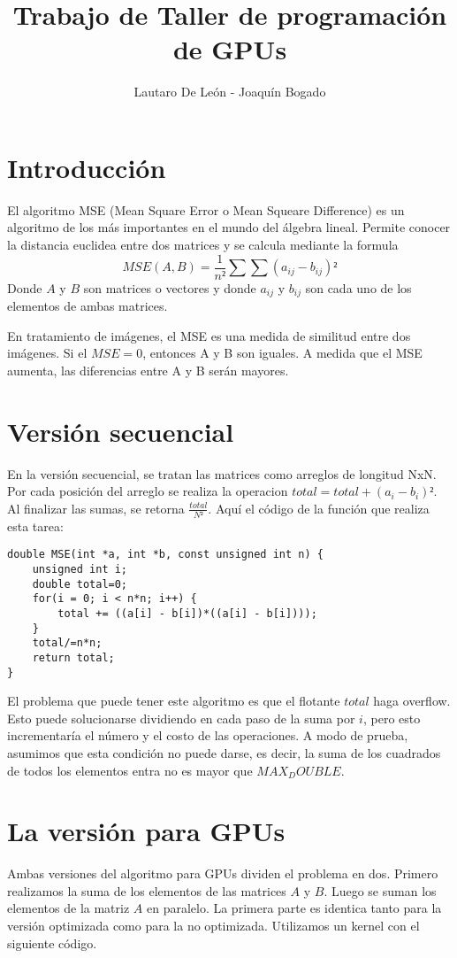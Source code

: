 \documentclass[a4paper,10pt]{article}
\title{Trabajo de Taller de programación de GPUs}
\author{Lautaro De León - Joaquín Bogado}
\begin{document}
\maketitle

\begin{abstract}

\end{abstract}

\section{Introducción}
El algoritmo MSE (Mean Square Error o Mean Squeare Difference) es un algoritmo de los más importantes en el mundo del álgebra lineal. Permite conocer la distancia euclidea entre dos matrices y se calcula mediante la formula 
$$MSE (A, B) = \frac{1}{n²} \sum \sum (a_{ij} - b_{ij})² $$
Donde $A$ y $B$ son matrices o vectores y donde $a_{ij}$ y $b_{ij}$ son cada uno de los elementos de ambas matrices.

En tratamiento de imágenes, el MSE es una medida de similitud entre dos imágenes. Si el $MSE = 0$, entonces A y B son iguales. A medida que el MSE aumenta, las diferencias entre A y B serán mayores.
\section{Versión secuencial}
En la versión secuencial, se tratan las matrices como arreglos de longitud NxN. Por cada posición del arreglo se realiza la operacion $total = total + (a_i - b_i)²$. Al finalizar las sumas, se retorna $\frac{total}{N²}$.
Aquí el código de la función que realiza esta tarea:
\begin{lstlisting}[frame=single]
double MSE(int *a, int *b, const unsigned int n) {
    unsigned int i;
    double total=0;
    for(i = 0; i < n*n; i++) {
        total += ((a[i] - b[i])*((a[i] - b[i])));
    }
    total/=n*n;
    return total;
}
\end{lstlisting}

El problema que puede tener este algoritmo es que el flotante $total$ haga overflow. Esto puede solucionarse dividiendo en cada paso de la suma por $i$, pero esto incrementaría el número y el costo de las operaciones. A modo de prueba, asumimos que esta condición no puede darse, es decir, la suma de los cuadrados de todos los elementos entra no es mayor que $MAX_DOUBLE$.


\section{La versión para GPUs}
Ambas versiones del algoritmo para GPUs dividen el problema en dos. Primero realizamos la suma de los elementos de las matrices $A$ y $B$. Luego se suman los elementos de la matriz $A$ en paralelo. La primera parte es identica tanto para la versión optimizada como para la no optimizada. Utilizamos un kernel con el siguiente código.
\end{document}
